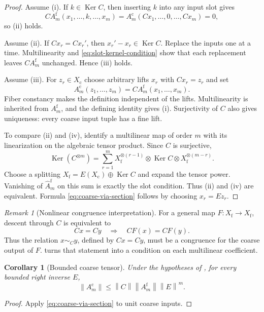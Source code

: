 \documentclass[11pt]{article}
\newtheorem{corollary}[theorem]{Corollary}
\theoremstyle{definition}
\theoremstyle{remark}
\newtheorem{remark}[theorem]{Remark}
\newcommand{\Ker}{\operatorname{Ker}}
\newcommand{\norm}[1]{\left\lVert #1\right\rVert}
\newcommand{\fine}{\mathrm f}
\newcommand{\coarse}{\mathrm c}
\begin{document}
\begin{proof}
Assume (i).  If $k\in\Ker C$, then inserting $k$ into any input slot gives
\[
  CA_m^{\fine}(x_1,\ldots,k,\ldots,x_m)
  =
  A_m^{\coarse}(Cx_1,\ldots,0,\ldots,Cx_m)=0,
\]
so (ii) holds.

Assume (ii).  If $Cx_r=Cx_r'$, then $x_r'-x_r\in\Ker C$.  Replace the inputs one at a time.  Multilinearity and \eqref{eq:slot-kernel-condition} show that each replacement leaves $CA_m^{\fine}$ unchanged.  Hence (iii) holds.

Assume (iii).  For $z_r\in X_{\coarse}$ choose arbitrary lifts $x_r$ with $Cx_r=z_r$ and set
\[
  A_m^{\coarse}(z_1,\ldots,z_m)
  =
  CA_m^{\fine}(x_1,\ldots,x_m).
\]
Fiber constancy makes the definition independent of the lifts.  Multilinearity is inherited from $A_m^{\fine}$, and the defining identity gives (i).  Surjectivity of $C$ also gives uniqueness: every coarse input tuple has a fine lift.

To compare (ii) and (iv), identify a multilinear map of order $m$ with its linearization on the algebraic tensor product.  Since $C$ is surjective,
\[
  \Ker(C^{\otimes m})
  =
  \sum_{r=1}^m
  X_{\fine}^{\otimes(r-1)}\otimes\Ker C\otimes
  X_{\fine}^{\otimes(m-r)}.
\]
Choose a splitting $X_{\fine}=E(X_{\coarse})\oplus\Ker C$ and expand the tensor power.  Vanishing of $\widehat A_m^{\fine}$ on this sum is exactly the slot condition.  Thus (ii) and (iv) are equivalent.  Formula \eqref{eq:coarse-via-section} follows by choosing $x_r=Ez_r$.
\end{proof}

\begin{remark}[Nonlinear congruence interpretation]\label{rem:nonlinear-congruence}
For a general map $F:X_{\fine}\to X_{\fine}$, descent through $C$ is equivalent to
\[
  Cx=Cy
  \quad\Longrightarrow\quad
  CF(x)=CF(y).
\]
Thus the relation $x\sim_Cy$, defined by $Cx=Cy$, must be a congruence for the coarse output of $F$.   turns that statement into a condition on each multilinear coefficient.
\end{remark}

\begin{corollary}[Bounded coarse tensor]\label{cor:bounded-coarse-tensor}
Under the hypotheses of , for every bounded right inverse $E$,
\[
  \norm{A_m^{\coarse}}
  \leq
  \norm{C}\norm{A_m^{\fine}}\norm{E}^m.
\]
\end{corollary}

\begin{proof}
Apply \eqref{eq:coarse-via-section} to unit coarse inputs.
\end{proof}
\end{document}

